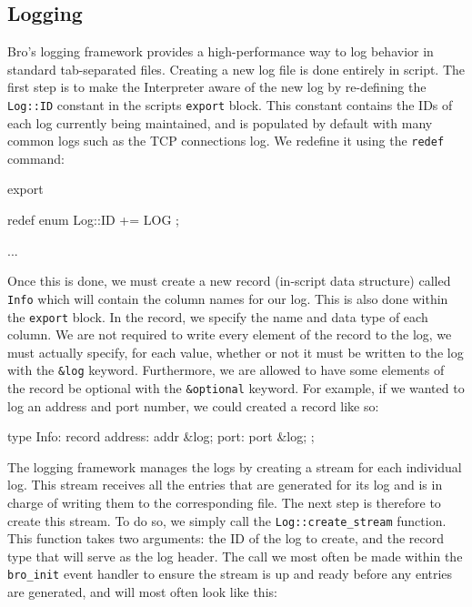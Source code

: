 \subsection{Logging} \label{section: logging}
Bro's logging framework provides a high-performance way to log behavior in standard tab-separated files. Creating a new log file is done entirely in script. The first step is to make the Interpreter aware of the new log by re-defining the \texttt{Log::ID} constant in the scripts \texttt{export} block. This constant contains the IDs of each log currently being maintained, and is populated by default with many common logs such as the TCP connections log. We redefine it using the \texttt{redef} command: \\

\begin{code}
export {
	redef enum Log::ID += { LOG };
	
	
	...
}
\end{code}

Once this is done, we must create a new record (in-script data structure) called \texttt{Info} which will contain the column names for our log. This is also done within the \texttt{export} block. In the record, we specify the name and data type of each column. We are not required to write every element of the record to the log, we must actually specify, for each value, whether or not it must be written to the log with the \texttt{\&log} keyword. Furthermore, we are allowed to have some elements of the record be optional with the \texttt{\&optional} keyword. For example, if we wanted to log an address and port number, we could created a record like so: \\

\begin{code}
	type Info: record {
		address:		addr &log;
		port:			port &log;	
	};
\end{code}

The logging framework manages the logs by creating a stream for each individual log. This stream receives all the entries that are generated for its log and is in charge of writing them to the corresponding file. The next step is therefore to create this stream. To do so, we simply call the \texttt{Log::create\_stream} function. This function takes two arguments: the ID of the log to create, and the record type that will serve as the log header. The call we most often be made within the \texttt{bro\_init} event handler to ensure the stream is up and ready before any entries are generated, and will most often look like this:\\

